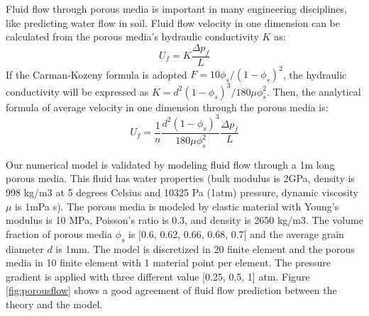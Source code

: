 \documentclass[preprint,12pt]{elsarticle}
\begin{document}
%
%
Fluid flow through porous media is important in many engineering disciplines, like predicting water flow in soil. Fluid flow velocity in one dimension can be calculated from the porous media's hydraulic conductivity $K$ as:\\
%
%
\begin{equation}
  {U}_f   = K \frac{\Delta p_f}{L}
\end{equation}
%
%
If the Carman-Kozeny formula is adopted $F = 10\phi_s/(1-\phi_s)^2$, the hydraulic conductivity will be expressed as  $K = d^2 (1-\phi_s)^3 / 180 \mu \phi_s^2$. Then, the analytical formula of average velocity in one dimension through the porous media is:\\
%
%
\begin{equation}
  {U}_f  = \frac{1}{n} \frac{d^2 (1-\phi_s)^3}{180 \mu \phi_s^2} \frac{\Delta p_f}{L}
\end{equation}

%
%
Our numerical model is validated by modeling fluid flow through a 1m long porous media. This fluid has water properties (bulk modulus is 2GPa, density is 998 kg/m3 at 5 degrees Celsius and 10325 Pa (1atm) pressure, dynamic viscosity $\mu$ is 1mPa s). The porous media is modeled by elastic material with Young's modulus is 10 MPa, Poisson's ratio is 0.3, and density is 2650 kg/m3. The volume fraction of porous media $\phi_s$ is [0.6, 0.62, 0.66, 0.68, 0.7] and the average grain diameter $d$ is 1mm. The model is discretized in 20 finite element and the porous media in 10 finite element with 1 material point per element. The pressure gradient is applied with three different value [0.25, 0.5, 1] atm. Figure \ref{fig:porousflow} shows a good agreement of fluid flow prediction between the theory and the model. \\
%
\end{document}
